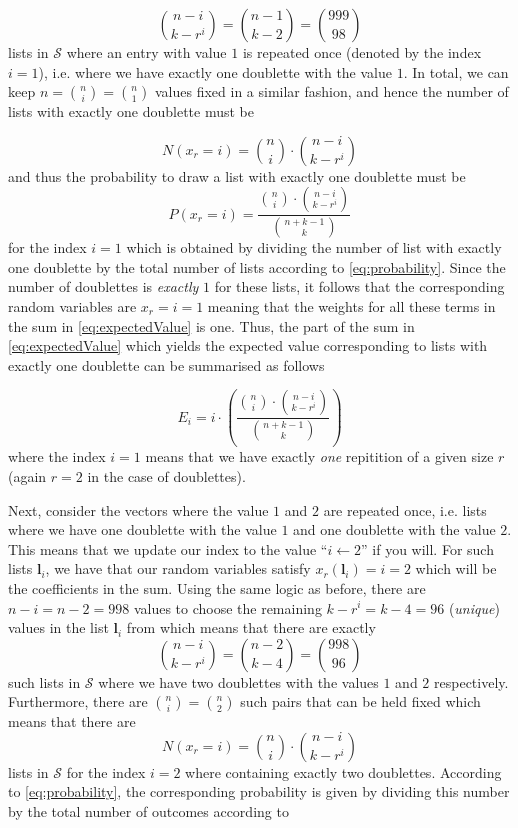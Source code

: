 \documentclass{article}
\begin{document}
$${n-i\choose k-r^i}={n-1\choose k-2}={999\choose 98}$$
lists in $\mathcal{S}$ where an entry with value $1$ is repeated once (denoted by the index $i=1$), i.e. where we have exactly one doublette with the value $1$. In total, we can keep $n={n\choose i}={n\choose 1}$ values fixed in a similar fashion, and hence the number of lists with exactly one doublette must be

$$N(x_r=i)= {n\choose i}\cdot{n-i\choose k-r^i}$$
and thus the probability to draw a list with exactly one doublette must be
$$P(x_r=i)=\dfrac{{n\choose i}\cdot{n-i\choose k-r^i}}{{n+k-1\choose k}}$$
for the index $i=1$ which is obtained by dividing the number of list with exactly one doublette by the total number of lists according to \eqref{eq:probability}. Since the number of doublettes is \textit{exactly} $1$ for these lists,
it follows that the corresponding random variables are $x_r=i=1$ meaning that the weights for all these terms in the sum in \eqref{eq:expectedValue}
is one. Thus, the part of the sum in \eqref{eq:expectedValue} which yields the expected value corresponding to lists with exactly one doublette can be summarised as follows

$$E_i=i\cdot\left(\dfrac{{n\choose i}\cdot{n-i\choose k-r^i}}{{n+k-1\choose k}}\right)$$
where the index $i=1$ means that we have exactly \textit{one} repitition of a given size $r$ (again $r=2$ in the case of doublettes). 

Next, consider the vectors where the value $1$ and $2$ are repeated once, i.e. lists where we have one doublette with the value $1$
and one doublette with the value $2$. This means that we update our index to the value ``$i\gets 2$'' if you will. For such lists $\mathbf{l}_i$, we have that our random variables satisfy $x_r(\mathbf{l}_i)=i=2$ which will be the coefficients in the sum. Using the same logic as before, there are $n-i=n-2=998$ values to choose the remaining $k-r^i=k-4=96$ (\textit{unique}) values in the list $\mathbf{l}_i$ from which means that there are exactly 
$${n-i\choose k-r^i}={n-2\choose k-4}={998\choose 96}$$
such lists in $\mathcal{S}$ where we have two doublettes with the values $1$ and $2$ respectively. Furthermore, there are ${n\choose i}={n\choose 2}$ such pairs that can be held fixed which means that there are
$$N(x_r=i)= {n\choose i}\cdot{n-i\choose k-r^i}$$
lists in $\mathcal{S}$ for the index $i=2$ where containing exactly two doublettes. According to \eqref{eq:probability}, the corresponding probability is given by dividing this number by the total number of outcomes according to
\end{document}
